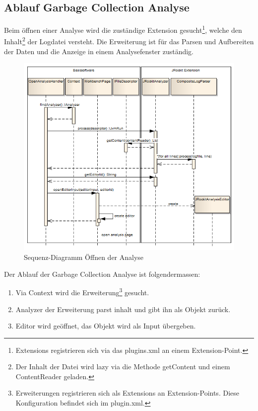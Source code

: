 \subsection{Ablauf Garbage Collection Analyse}
Beim öffnen einer Analyse wird die zuständige Extension gesucht\footnote{Extensions registrieren sich via das plugins.xml an einem Extension-Point. }, welche den Inhalt\footnote{Der Inhalt der Datei wird lazy via die Methode getContent und einem ContentReader geladen.} der Logdatei versteht. Die Erweiterung ist für das Parsen und Aufbereiten der Daten und die Anzeige in einem Analysefenster zuständig. 
 \begin{figure}[H]
  	\centering
    	\includegraphics[width=16cm]{images/core_sequence_analysis}
	\caption{Sequenz-Diagramm Öffnen der Analyse}
\end{figure}
Der Ablauf der Garbage Collection Analyse ist folgendermassen:
\begin{enumerate}
	\item Via Context wird die Erweiterung\footnote{Erweiterungen registrieren sich als Extensions an Extension-Points. Diese Konfiguration befindet sich im plugin.xml.} gesucht.
	\item Analyzer der Erweiterung parst inhalt und gibt ihn als Objekt zurück.
	\item Editor wird geöffnet, das Objekt wird als Input übergeben.
\end{enumerate}


